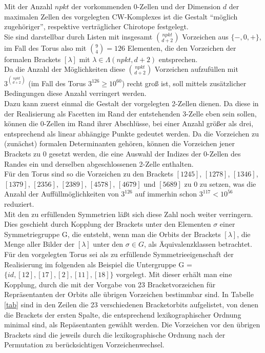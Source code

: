 Mit der Anzahl $npkt$ der vorkommenden 0-Zellen und der Dimension $d$ der
maximalen Zellen des vorgelegten CW-Komplexes ist die Gestalt "`möglich
zugehöriger"', respektive verträglicher Chirotope festgelegt.\\
Sie sind darstellbar durch Listen mit insgesamt ${npkt \choose d+2}$
Vorzeichen aus $\{-,0,+\}$, im Fall des Torus also mit ${9 \choose 4}=126$
Elementen, die den Vorzeichen der formalen Brackets $[\lambda]$ mit
$\lambda\in\Lambda(npkt,d+2)$ entsprechen.\\
Da die Anzahl der Möglichkeiten diese ${npkt \choose d+2}$ Vorzeichen
aufzufüllen mit $3^{npkt \choose d+2}$ (im Fall des Torus
$3^{126}\geq 10^{60}$) recht groß ist, soll mittels zusätzlicher Bedingungen
diese Anzahl verringert werden.\\
Dazu kann zuerst einmal die Gestalt der vorgelegten 2-Zellen dienen. Da diese
in der Realisierung als Facetten im Rand der entstehenden 3-Zelle eben sein
sollen, können die 0-Zellen im Rand ihrer Abschlüsse, bei einer Anzahl
größer als drei, entsprechend als linear abhängige Punkte gedeutet werden.
Da die Vorzeichen zu (zunächst) formalen Determinanten gehören, können die
Vorzeichen jener Brackets zu 0 gesetzt werden, die eine Auswahl der Indizes der
0-Zellen des Randes ein und derselben abgeschlossenen 2-Zelle enthalten.\\
Für den Torus sind so die Vorzeichen zu den Brackets $[1245]$, $[1278]$,
$[1346]$, $[1379]$, $[2356]$, $[2389]$, $[4578]$, $[4679]$ und $[5689]$ zu 0
zu setzen, was die Anzahl der Auf\-füll\-mög\-lich\-kei\-ten von $3^{126}$ auf
immerhin schon $3^{117}< 10^{56}$ reduziert.\\
Mit den zu erfüllenden Symmetrien läßt sich diese Zahl noch weiter
verringern. Dies geschieht durch Kopplung der Brackets unter den Elementen
$\sigma$ einer Symmetriegruppe G, die entsteht, wenn man die Orbits der Brackets
$[\lambda]$, die Menge aller Bilder der $[\lambda]$ unter den $\sigma\in G$, als
Äquivalenzklassen betrachtet.\\
Für den vorgelegten Torus sei als zu erfüllende Symmetrieeigenschaft der
Realisierung im folgenden als Beispiel die Untergruppe G =
$\{ id, [12], [17], [2], [11], [18] \}$ vorgelegt. Mit dieser erhält man eine
Kopplung, durch die mit der Vorgabe von 23 Bracketvorzeichen für
Repräsentanten der Orbits alle übrigen Vorzeichen bestimmbar sind. In Tabelle
\ref{tab} sind in den Zeilen die 23 verschiedenen Bracketorbits aufgelistet,
von denen die Brackets der ersten Spalte, die entsprechend lexikographischer
Ordnung minimal sind, als Repäsentanten gewählt werden.
Die Vorzeichen vor den übrigen Brackets sind die jeweils durch die
lexikographische Ordnung nach der Permutation zu berücksichtigen
Vorzeichenwechsel.

